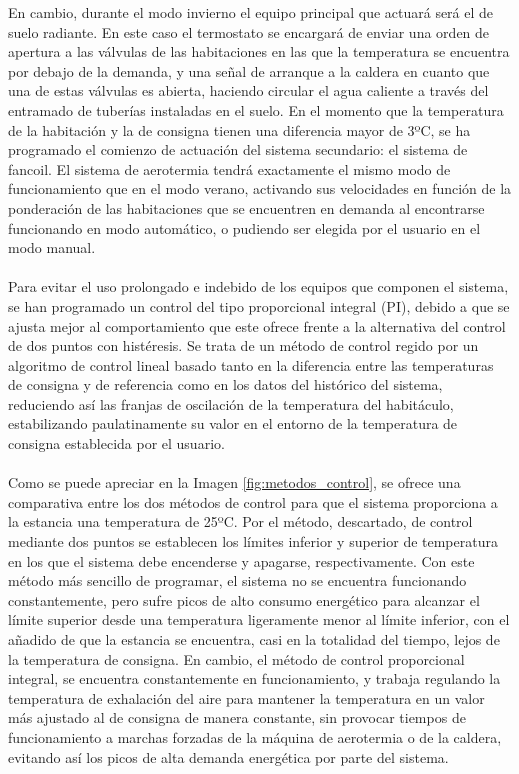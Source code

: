 En cambio, durante el modo invierno el equipo principal que actuará será el de suelo radiante. En este caso el termostato se encargará de enviar una orden de apertura a las válvulas de las habitaciones en las que la temperatura se encuentra por debajo de la demanda, y una señal de arranque a la caldera en cuanto que una de estas válvulas es abierta, haciendo circular el agua caliente a través del entramado de tuberías instaladas en el suelo. En el momento que la temperatura de la habitación y la de consigna tienen una diferencia mayor de 3ºC, se ha programado el comienzo de actuación del sistema secundario: el sistema de fancoil. El sistema de aerotermia tendrá exactamente el mismo modo de funcionamiento que en el modo verano, activando sus velocidades en función de la ponderación de las habitaciones que se encuentren en demanda al encontrarse funcionando en modo automático, o pudiendo ser elegida por el usuario en el modo manual. \\\\
Para evitar el uso prolongado e indebido de los equipos que componen el sistema, se han programado un control del tipo proporcional integral (PI), debido a que se ajusta mejor al comportamiento que este ofrece frente a la alternativa del control de dos puntos con histéresis. Se trata de un método de control regido por un algoritmo de control lineal basado tanto en la diferencia entre las temperaturas de consigna y de referencia como en los datos del histórico del sistema, reduciendo así las franjas de oscilación de la temperatura del habitáculo, estabilizando paulatinamente su valor en el entorno de la temperatura de consigna establecida por el usuario. \\\\
Como se puede apreciar en la Imagen \ref{fig:metodos_control}, se ofrece una comparativa entre los dos métodos de control para que el sistema proporciona a la estancia una temperatura de 25ºC. Por el método, descartado, de control mediante dos puntos se establecen los límites inferior y superior de temperatura en los que el sistema debe encenderse y apagarse, respectivamente. Con este método más sencillo de programar, el sistema no se encuentra funcionando constantemente, pero sufre picos de alto consumo energético para alcanzar el límite superior desde una temperatura ligeramente menor al límite inferior, con el añadido de que la estancia se encuentra, casi en la totalidad del tiempo, lejos de la temperatura de consigna. En cambio, el método de control proporcional integral, se encuentra constantemente en funcionamiento, y trabaja regulando la temperatura de exhalación del aire para mantener la temperatura en un valor más ajustado al de consigna de manera constante, sin provocar tiempos de funcionamiento a marchas forzadas de la máquina de aerotermia o de la caldera, evitando así los picos de alta demanda energética por parte del sistema. 
